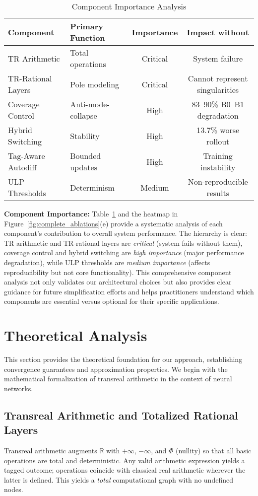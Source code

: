 \documentclass[twoside,11pt]{article}
\newcommand{\RR}{\mathbb{R}}
\begin{document}
\begin{table}[t]
\centering
\caption{Component Importance Analysis}
\label{tab:component_importance}
\begin{tabular}{llcc}
\toprule
Component & Primary Function & Importance & Impact without \\
\midrule
TR Arithmetic & Total operations & Critical & System failure \\
TR-Rational Layers & Pole modeling & Critical & Cannot represent singularities \\
Coverage Control & Anti-mode-collapse & High & 83--90\% B0--B1 degradation \\
Hybrid Switching & Stability & High & 13.7\% worse rollout \\
Tag-Aware Autodiff & Bounded updates & High & Training instability \\
ULP Thresholds & Determinism & Medium & Non-reproducible results \\
\bottomrule
\end{tabular}
\end{table}

\textbf{Component Importance:} Table~\ref{tab:component_importance} and the heatmap in Figure~\ref{fig:complete_ablations}(e) provide a systematic analysis of each component's contribution to overall system performance. The hierarchy is clear: TR arithmetic and TR-rational layers are \emph{critical} (system fails without them), coverage control and hybrid switching are \emph{high importance} (major performance degradation), while ULP thresholds are \emph{medium importance} (affects reproducibility but not core functionality). This comprehensive component analysis not only validates our architectural choices but also provides clear guidance for future simplification efforts and helps practitioners understand which components are essential versus optional for their specific applications.

\section{Theoretical Analysis}
\label{sec:theory}
This section provides the theoretical foundation for our approach, establishing convergence guarantees and approximation properties. We begin with the mathematical formalization of transreal arithmetic in the context of neural networks.

\subsection{Transreal Arithmetic and Totalized Rational Layers}
Transreal arithmetic augments $\RR$ with $+\infty$, $-\infty$, and $\Phi$ (nullity) so that all basic operations are total and deterministic. Any valid arithmetic expression yields a tagged outcome; operations coincide with classical real arithmetic wherever the latter is defined. This yields a \emph{total} computational graph with no undefined nodes.
\end{document}

